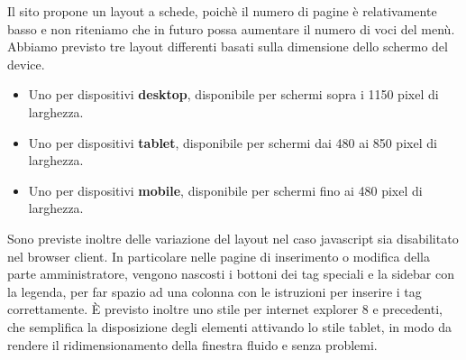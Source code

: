 Il sito propone un layout a schede, poich\`e il numero di pagine \`e relativamente basso e non riteniamo che in futuro possa aumentare il numero di voci del men\`u.
Abbiamo previsto tre layout differenti basati sulla dimensione dello schermo del device. 
\begin{itemize}
	\item Uno per dispositivi {\bfseries desktop}, disponibile per schermi sopra i 1150 pixel di larghezza.
	\item Uno per dispositivi {\bfseries tablet}, disponibile per schermi dai 480 ai 850 pixel di larghezza.
	\item Uno per dispositivi {\bfseries mobile}, disponibile per schermi fino ai 480 pixel di larghezza.
\end{itemize}



Sono previste inoltre delle variazione del layout nel caso javascript sia disabilitato nel browser client. In particolare nelle pagine di inserimento o modifica della parte amministratore, vengono nascosti i bottoni dei tag speciali e la sidebar con la legenda, per far spazio ad una colonna con le istruzioni per inserire i tag correttamente.
\`E previsto inoltre uno stile per internet explorer 8 e precedenti, che semplifica la disposizione degli elementi attivando lo stile tablet, in modo da rendere il ridimensionamento della finestra fluido e senza problemi.

